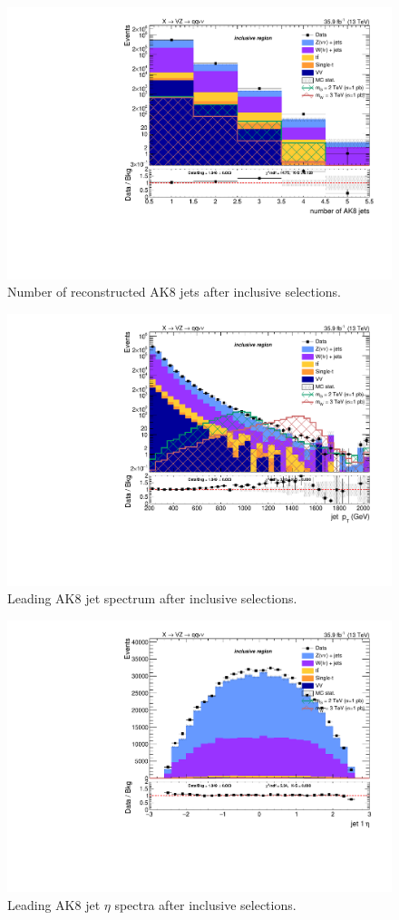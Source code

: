 \begin{figure}[!htb]
  \begin{center}
    \includegraphics[width=.495\textwidth]{plots/v9_thesis/XVZnnInc/nFatJets.pdf}
  \end{center}
  \caption{Number of reconstructed AK8 jets after inclusive selections.}
  \label{fig:n_AK8}
\end{figure}

\begin{figure}[!htb]
  \begin{center}
    \includegraphics[width=.495\textwidth]{plots/v9_thesis/XVZnnInc/FatJet1_pt.pdf}
  \end{center}
  \caption{Leading AK8 jet \pt spectrum after inclusive selections.}
  \label{fig:AK8jet_pt}
\end{figure}

\begin{figure}[!htb]
  \begin{center}
    \includegraphics[width=.495\textwidth]{plots/v9_thesis/XVZnnInc/FatJet1_eta.pdf}
  \end{center}
  \caption{Leading AK8 jet $\eta$ spectra after inclusive selections.}
  \label{fig:AK8jet_eta}
\end{figure}

